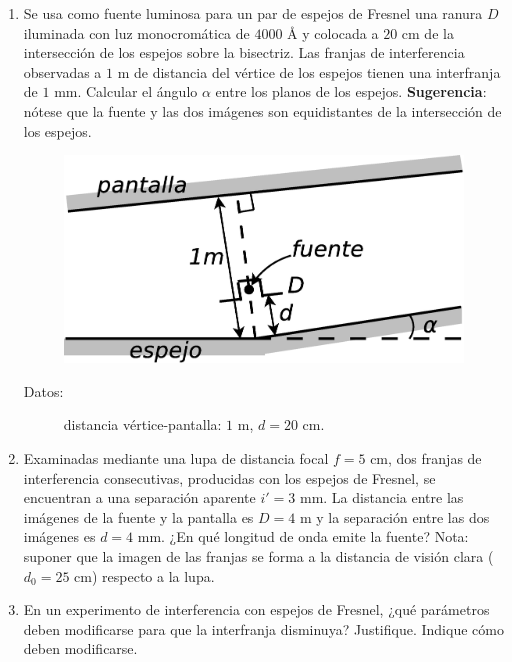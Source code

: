 \documentclass[11pt,spanish]{article}
\begin{document}
\begin{enumerate}
    \item Se usa como fuente luminosa para un par de espejos de Fresnel una
    ranura $D$ iluminada con luz monocromática de $4000$ Å y colocada a
    $20$ cm de la intersección de los espejos sobre la bisectriz. Las franjas
    de interferencia observadas a $1$ m de distancia del vértice de los
    espejos tienen una interfranja de $1$ mm. Calcular el ángulo $\alpha$
    entre los planos de los espejos. \textbf{Sugerencia}: nótese que
    la fuente y las dos imágenes son equidistantes de la intersección
    de los espejos. 
    \begin{figure}[H]
        \centering{}
        \includegraphics[clip,scale=0.25]{figs/ej5-8}
    \end{figure}
    \begin{description}
        \item [{Datos:}] distancia vértice-pantalla: $1$ m, $d=20$ cm.
    \end{description}


    \item Examinadas mediante una lupa de distancia focal $f=5$ cm, dos franjas
    de interferencia consecutivas, producidas con los espejos de Fresnel,
    se encuentran a una separación aparente $i'=3$ mm. La distancia entre
    las imágenes de la fuente y la pantalla es $D=4$ m y la separación
    entre las dos imágenes es $d=4$ mm. ¿En qué longitud de onda emite
    la fuente? Nota: suponer que la imagen de las franjas se forma a la
    distancia de visión clara ($d_0=25$ cm) respecto a la lupa.
    

    \item En un experimento de interferencia con espejos de Fresnel, ¿qué parámetros
    deben modificarse para que la interfranja disminuya? Justifique. Indique
    cómo deben modificarse.


\end{enumerate}
\end{document}
